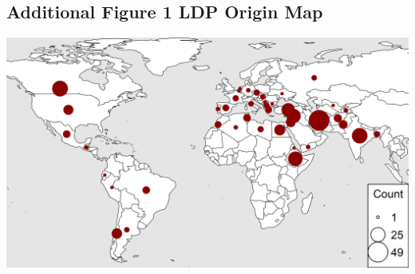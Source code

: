 \documentclass[
]{article}
\begin{document}
\hypertarget{additional-figure-1-ldp-origin-map}{%
\subsection{Additional Figure 1 LDP Origin
Map}\label{additional-figure-1-ldp-origin-map}}

\includegraphics{Additional/Additional_Figure_01.png}
\end{document}
